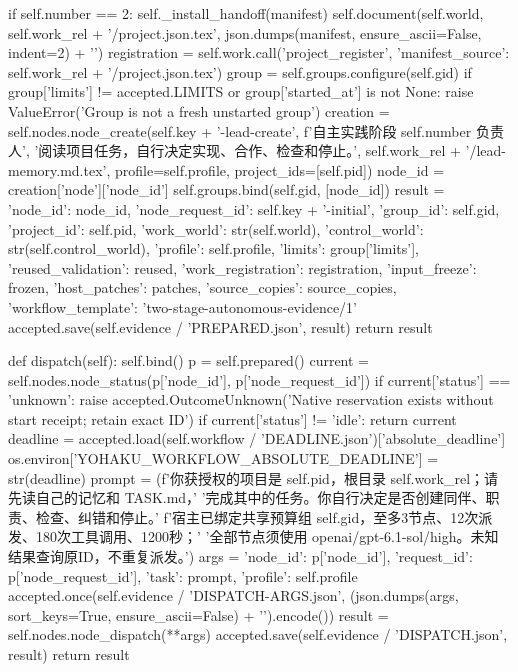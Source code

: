         if self.number == 2:
            self._install_handoff(manifest)
        self.document(self.world, self.work_rel + '/project.json.tex', json.dumps(manifest, ensure_ascii=False, indent=2) + '\n')
        registration = self.work.call('project_register', {'manifest_source': self.work_rel + '/project.json.tex'})
        group = self.groups.configure(self.gid)
        if group['limits'] != accepted.LIMITS or group['started_at'] is not None:
            raise ValueError('Group is not a fresh unstarted group')
        creation = self.nodes.node_create(self.key + '-lead-create', f'自主实践阶段 {self.number} 负责人',
            '阅读项目任务，自行决定实现、合作、检查和停止。', self.work_rel + '/lead-memory.md.tex',
            profile=self.profile, project_ids=[self.pid])
        node_id = creation['node']['node_id']
        self.groups.bind(self.gid, [node_id])
        result = {'node_id': node_id, 'node_request_id': self.key + '-initial', 'group_id': self.gid,
                  'project_id': self.pid, 'work_world': str(self.world), 'control_world': str(self.control_world),
                  'profile': self.profile, 'limits': group['limits'], 'reused_validation': reused,
                  'work_registration': registration, 'input_freeze': frozen, 'host_patches': patches,
                  'source_copies': source_copies,
                  'workflow_template': 'two-stage-autonomous-evidence/1'}
        accepted.save(self.evidence / 'PREPARED.json', result)
        return result

    def dispatch(self):
        self.bind()
        p = self.prepared()
        current = self.nodes.node_status(p['node_id'], p['node_request_id'])
        if current['status'] == 'unknown':
            raise accepted.OutcomeUnknown('Native reservation exists without start receipt; retain exact ID')
        if current['status'] != 'idle':
            return current
        deadline = accepted.load(self.workflow / 'DEADLINE.json')['absolute_deadline']
        os.environ['YOHAKU_WORKFLOW_ABSOLUTE_DEADLINE'] = str(deadline)
        prompt = (f'你获授权的项目是 {self.pid}，根目录 {self.work_rel}；请先读自己的记忆和 TASK.md，'
                  '完成其中的任务。你自行决定是否创建同伴、职责、检查、纠错和停止。'
                  f'宿主已绑定共享预算组 {self.gid}，至多3节点、12次派发、180次工具调用、1200秒；'
                  '全部节点须使用 openai/gpt-6.1-sol/high。未知结果查询原ID，不重复派发。')
        args = {'node_id': p['node_id'], 'request_id': p['node_request_id'], 'task': prompt, 'profile': self.profile}
        accepted.once(self.evidence / 'DISPATCH-ARGS.json', (json.dumps(args, sort_keys=True, ensure_ascii=False) + '\n').encode())
        result = self.nodes.node_dispatch(**args)
        accepted.save(self.evidence / 'DISPATCH.json', result)
        return result

